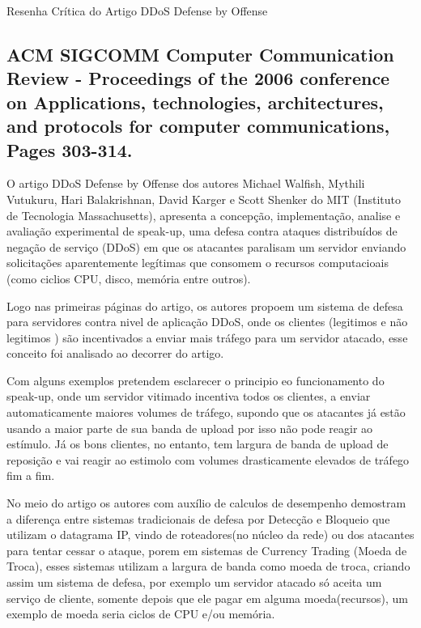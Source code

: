 \documentclass[a4paper,12pt]{article}
\begin{document}
\LARGE
Resenha Crítica do Artigo DDoS Defense by Offense
\large

\subsection*{\textbf{ACM SIGCOMM } Computer Communication Review - Proceedings of the 2006 conference on Applications, technologies, architectures, and protocols for computer communications, Pages 303-314.}
\vspace{0.3cm}


O artigo DDoS Defense by Offense \cite{Walfish:2006:DDO:1151659.1159948} dos autores Michael Walfish, Mythili Vutukuru, Hari Balakrishnan, David Karger  e  Scott Shenker do MIT (Instituto de Tecnologia Massachusetts), apresenta a concepção, implementação, analise e avaliação experimental de speak-up, uma defesa contra ataques distribuídos de negação de serviço (DDoS) em que os atacantes paralisam um servidor enviando solicitações aparentemente legítimas que consomem o recursos computacioais (como ciclios CPU, disco, memória entre outros).


\vspace{0.3cm}

 Logo nas primeiras páginas do artigo, os autores propoem um sistema de defesa para servidores contra nivel de aplicação DDoS, onde os clientes (legitimos e não legitimos ) são incentivados a enviar mais tráfego para um servidor atacado, esse conceito foi analisado ao decorrer do artigo.

\vspace{0.3cm}
Com alguns exemplos pretendem esclarecer o principio eo funcionamento do speak-up, onde um servidor vitimado incentiva todos os clientes, a enviar automaticamente maiores volumes de tráfego, supondo que os atacantes já estão usando a maior parte de sua banda de upload por isso não pode reagir ao estímulo. Já os bons clientes, no entanto, tem largura de banda de upload de reposição e vai reagir ao estimolo com volumes drasticamente elevados de tráfego fim a fim.

\vspace{0.3cm}

No meio do artigo os autores com auxílio de calculos de desempenho demostram  a diferença entre sistemas tradicionais de defesa por Detecção e Bloqueio que utilizam o datagrama IP, vindo de roteadores(no núcleo da rede) ou dos atacantes para tentar cessar o ataque, porem em sistemas de Currency Trading (Moeda de Troca), esses sistemas utilizam a largura de banda como moeda de troca, criando assim um sistema de defesa, por exemplo um servidor atacado só aceita um serviço de cliente, somente depois que ele pagar em alguma moeda(recursos), um exemplo de moeda seria ciclos de CPU e/ou memória. 
\end{document}
